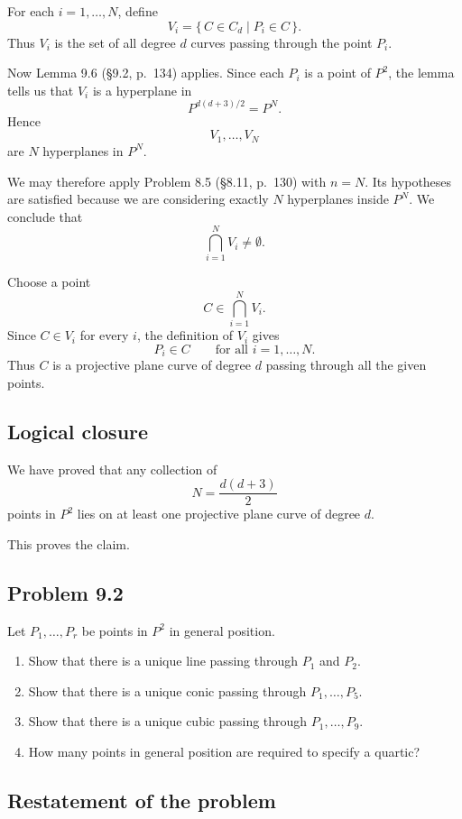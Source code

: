 \documentclass[a4paper,12pt,openany]{article}
\theoremstyle{plain}
\theoremstyle{definition}
\theoremstyle{remark}
\begin{document}
For each $i=1,\dots,N$, define
\[
V_i=\{\, C\in C_d \mid P_i\in C \,\}.
\]
Thus $V_i$ is the set of all degree $d$ curves passing through the point
$P_i$.

Now Lemma 9.6 (\S9.2, p.~134) applies. Since each $P_i$ is a point of
$P^2$, the lemma tells us that $V_i$ is a hyperplane in
\[
P^{d(d+3)/2}=P^N.
\]
Hence
\[
V_1,\dots,V_N
\]
are $N$ hyperplanes in $P^N$.

We may therefore apply Problem 8.5 (\S8.11, p.~130) with $n=N$. Its
hypotheses are satisfied because we are considering exactly $N$ hyperplanes
inside $P^N$. We conclude that
\[
\bigcap_{i=1}^N V_i \neq \emptyset.
\]

Choose a point
\[
C\in \bigcap_{i=1}^N V_i.
\]
Since $C\in V_i$ for every $i$, the definition of $V_i$ gives
\[
P_i\in C \qquad \text{for all } i=1,\dots,N.
\]
Thus $C$ is a projective plane curve of degree $d$ passing through all the
given points.

\subsection*{Logical closure}

We have proved that any collection of
\[
N=\frac{d(d+3)}{2}
\]
points in $P^2$ lies on at least one projective plane curve of degree $d$.

This proves the claim.


\subsection*{Problem 9.2}

Let $P_1,\dots,P_r$ be points in $P^2$ in general position.

\begin{enumerate}
    \item[(a)] Show that there is a unique line passing through $P_1$ and $P_2$.
    \item[(b)] Show that there is a unique conic passing through $P_1,\dots,P_5$.
    \item[(c)] Show that there is a unique cubic passing through $P_1,\dots,P_9$.
    \item[(d)] How many points in general position are required to specify a quartic?
\end{enumerate}

\subsection*{Restatement of the problem}
\end{document}
